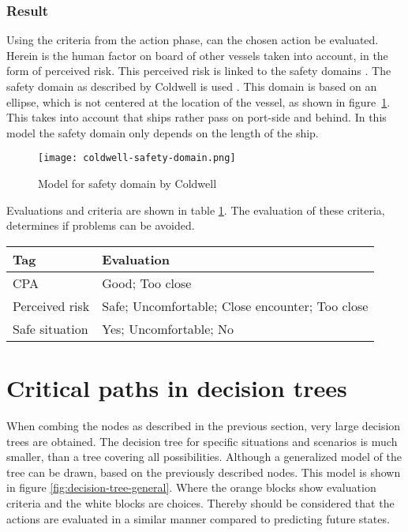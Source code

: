 \subsubsection{Result}
Using the criteria from the action phase, can the chosen action be evaluated. Herein is the human factor on board of other vessels taken into account, in the form of perceived risk. This perceived risk is linked to the safety domains \cite{Szlapczynski2017a}. The safety domain as described by Coldwell is used \cite{Coldwell1983}. This domain is based on an ellipse, which is not centered at the location of the vessel, as shown in figure~\ref{fig:coldwell-safety-domain}. This takes into account that ships rather pass on port-side and behind. In this model the safety domain only depends on the length of the ship.

\begin{figure}[p]
	\centering
	\texttt{[image: coldwell-safety-domain.png]}
	\caption{Model for safety domain by Coldwell}
	\label{fig:coldwell-safety-domain}
\end{figure}

Evaluations and criteria are shown in table \ref{tab:criteria-safe-situation}. The evaluation of these criteria, determines if problems can be avoided.

\begin{table}[H]
	\begin{tabular}{p{}|p{}}
		\toprule
		Tag & Evaluation\\
		\midrule
		CPA & Good; Too close\\
		Perceived risk & Safe; Uncomfortable; Close encounter; Too close\\
		Safe situation & Yes; Uncomfortable; No\\
		\bottomrule
	\end{tabular}
	
	\label{tab:criteria-safe-situation}
\end{table}


\section{Critical paths in decision trees}
When combing the nodes as described in the previous section, very large decision trees are obtained. The decision tree for specific situations and scenarios is much smaller, than a tree covering all possibilities. Although a generalized model of the tree can be drawn, based on the previously described nodes. This model is shown in figure \ref{fig:decision-tree-general}. Where the orange blocks show evaluation criteria and the white blocks are choices. Thereby should be considered that the actions are evaluated in a similar manner compared to predicting future states.

